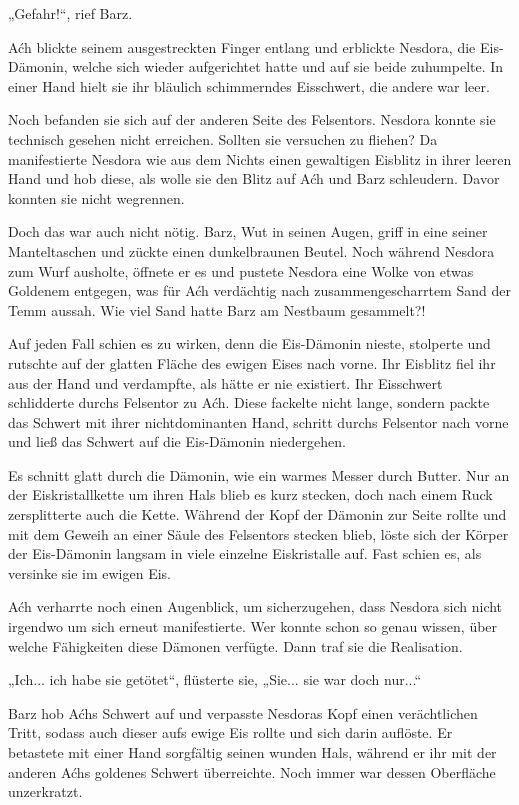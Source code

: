 „Gefahr!“, rief Barz.

Aćh blickte seinem ausgestreckten Finger entlang und erblickte Nesdora, die Eis-Dämonin, welche sich wieder aufgerichtet hatte und auf sie beide zuhumpelte. In einer Hand hielt sie ihr bläulich schimmerndes Eisschwert, die andere war leer.

Noch befanden sie sich auf der anderen Seite des Felsentors. Nesdora konnte sie technisch gesehen nicht erreichen. Sollten sie versuchen zu fliehen? Da manifestierte Nesdora wie aus dem Nichts einen gewaltigen Eisblitz in ihrer leeren Hand und hob diese, als wolle sie den Blitz auf Aćh und Barz schleudern. Davor konnten sie nicht wegrennen.

Doch das war auch nicht nötig. Barz, Wut in seinen Augen, griff in eine seiner Manteltaschen und zückte einen dunkelbraunen Beutel. Noch während Nesdora zum Wurf ausholte, öffnete er es und pustete Nesdora eine Wolke von etwas Goldenem entgegen, was für Aćh verdächtig nach zusammengescharrtem Sand der Temm aussah. Wie viel Sand hatte Barz am Nestbaum gesammelt?!

Auf jeden Fall schien es zu wirken, denn die Eis-Dämonin nieste, stolperte und rutschte auf der glatten Fläche des ewigen Eises nach vorne. Ihr Eisblitz fiel ihr aus der Hand und verdampfte, als hätte er nie existiert. Ihr Eisschwert schlidderte durchs Felsentor zu Aćh. Diese fackelte nicht lange, sondern packte das Schwert mit ihrer nichtdominanten Hand, schritt durchs Felsentor nach vorne und ließ das Schwert auf die Eis-Dämonin niedergehen.

Es schnitt glatt durch die Dämonin, wie ein warmes Messer durch Butter. Nur an der Eiskristallkette um ihren Hals blieb es kurz stecken, doch nach einem Ruck zersplitterte auch die Kette. Während der Kopf der Dämonin zur Seite rollte und mit dem Geweih an einer Säule des Felsentors stecken blieb, löste sich der Körper der Eis-Dämonin langsam in viele einzelne Eiskristalle auf. Fast schien es, als versinke sie im ewigen Eis.

Aćh verharrte noch einen Augenblick, um sicherzugehen, dass Nesdora sich nicht irgendwo um sich erneut manifestierte. Wer konnte schon so genau wissen, über welche Fähigkeiten diese Dämonen verfügte. Dann traf sie die Realisation.

„Ich... ich habe sie getötet“, flüsterte sie, „Sie... sie war doch nur...“

Barz hob Aćhs Schwert auf und verpasste Nesdoras Kopf einen verächtlichen Tritt, sodass auch dieser aufs ewige Eis rollte und sich darin auflöste. Er betastete mit einer Hand sorgfältig seinen wunden Hals, während er ihr mit der anderen Aćhs goldenes Schwert überreichte. Noch immer war dessen Oberfläche unzerkratzt.

